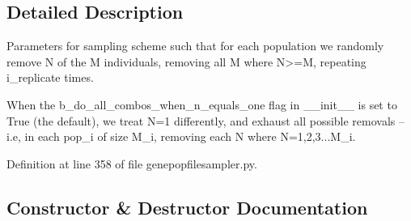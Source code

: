 \subsection{Detailed Description}
\begin{DoxyVerb}Parameters for sampling scheme such that for each population
we randomly remove N of the M individuals, removing all M where
N>=M, repeating i_replicate times. 

When the b_do_all_combos_when_n_equals_one flag in __init__ is
set to True (the default), we treat N=1 differently, and 
exhaust all possible removals -- i.e, in each pop_i 
of size M_i, removing each N where N=1,2,3...M_i.
\end{DoxyVerb}
 

Definition at line 358 of file genepopfilesampler.\+py.



\subsection{Constructor \& Destructor Documentation}
